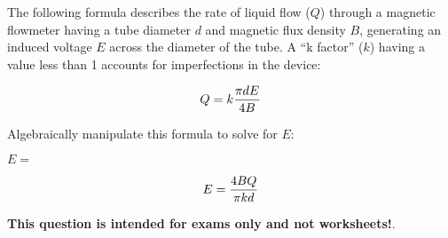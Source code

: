 

The following formula describes the rate of liquid flow ($Q$) through a magnetic flowmeter having a tube diameter $d$ and magnetic flux density $B$, generating an induced voltage $E$ across the diameter of the tube.  A ``k factor'' ($k$) having a value less than 1 accounts for imperfections in the device:

$$Q = k {\pi d E \over 4 B}$$

Algebraically manipulate this formula to solve for $E$:

\vskip 20pt

$E = $







$$E = {4 B Q \over \pi k d}$$







{\bf This question is intended for exams only and not worksheets!}.



